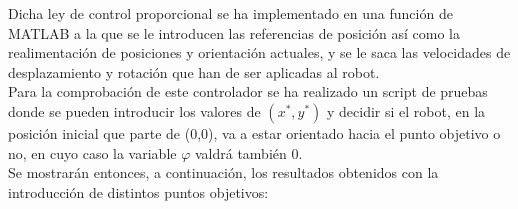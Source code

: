 \documentclass[a4paper,twoside]{article}
\begin{document}
	Dicha ley de control proporcional se ha implementado en una función de MATLAB a la que se le introducen las referencias de posición así como la realimentación de posiciones y orientación actuales, y se le saca las velocidades de desplazamiento y rotación que han de ser aplicadas al robot.\\
	
	Para la comprobación de este controlador se ha realizado un script de pruebas donde se pueden introducir los valores de $(x^*,y^*)$ y decidir si el robot, en la posición inicial que parte de (0,0), va a estar orientado hacia el punto objetivo o no, en cuyo caso la variable $\varphi$ valdrá también 0.\\
	Se mostrarán entonces, a continuación, los resultados obtenidos con la introducción de distintos puntos objetivos:\\
	\newpage
\end{document}
